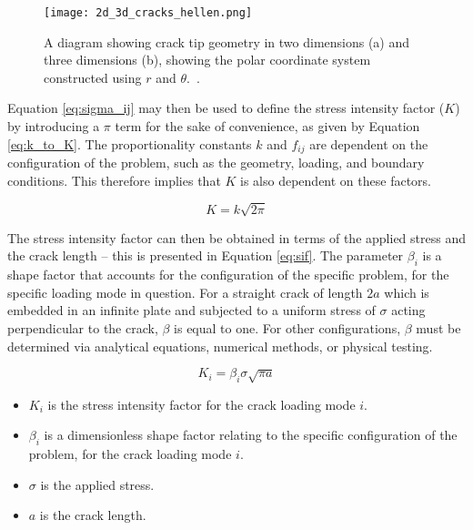 \begin{figure}[H]
	\centering
	\texttt{[image: 2d\_3d\_cracks\_hellen.png]}
	\caption{A diagram showing crack tip geometry in two dimensions (a) and three dimensions (b), showing the polar coordinate system constructed using $r$ and $\theta$.\ \cite{hellen_how_2001}.}
	\label{fig:2d_3d_cracks_hellen}
\end{figure}

\newpage
Equation \ref{eq:sigma_ij} may then be used to define the stress intensity factor ($K$) by introducing a $\pi$ term for the sake of convenience, as given by Equation \ref{eq:k_to_K}. The proportionality constants $k$ and $f_{ij}$ are dependent on the configuration of the problem, such as the geometry, loading, and boundary conditions. This therefore implies that $K$ is also dependent on these factors.

\begin{equation}
	K = k \sqrt{2 \pi}\label{eq:k_to_K}
\end{equation}

The stress intensity factor can then be obtained in terms of the applied stress and the crack length -- this is presented in Equation \ref{eq:sif}. The parameter $\beta_{i}$ is a shape factor that accounts for the configuration of the specific problem, for the specific loading mode in question. For a straight crack of length $2a$ which  is embedded in an infinite plate and subjected to a uniform stress of $\sigma$ acting perpendicular to the crack, $\beta$ is equal to one. For other configurations, $\beta$ must be determined via analytical equations, numerical methods, or physical testing.

\begin{equation}
	K_{i} = \beta_{i}\sigma \sqrt{\pi a}\label{eq:sif}
\end{equation}

\begin{itemize}
	\item $K_i$ is the stress intensity factor for the crack loading mode $i$.
	\item $\beta_{i} $ is a dimensionless shape factor relating to the specific configuration of the problem, for the crack loading mode $i$.
	\item $\sigma$ is the applied stress.
	\item $a$ is the crack length. 
\end{itemize}

